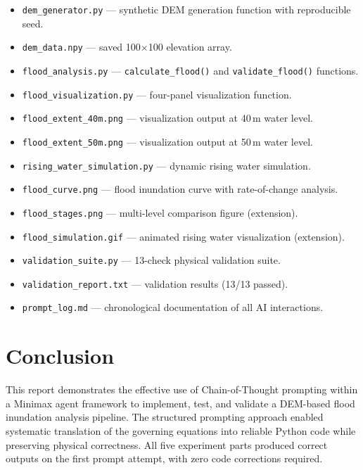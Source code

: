 \documentclass[12pt, a4paper]{article}
\begin{document}
\begin{itemize}[leftmargin=1.8em]
  \item \texttt{dem\_generator.py} --- synthetic DEM generation function with reproducible seed.
  \item \texttt{dem\_data.npy} --- saved 100$\times$100 elevation array.
  \item \texttt{flood\_analysis.py} --- \texttt{calculate\_flood()} and \texttt{validate\_flood()} functions.
  \item \texttt{flood\_visualization.py} --- four-panel visualization function.
  \item \texttt{flood\_extent\_40m.png} --- visualization output at 40\,m water level.
  \item \texttt{flood\_extent\_50m.png} --- visualization output at 50\,m water level.
  \item \texttt{rising\_water\_simulation.py} --- dynamic rising water simulation.
  \item \texttt{flood\_curve.png} --- flood inundation curve with rate-of-change analysis.
  \item \texttt{flood\_stages.png} --- multi-level comparison figure (extension).
  \item \texttt{flood\_simulation.gif} --- animated rising water visualization (extension).
  \item \texttt{validation\_suite.py} --- 13-check physical validation suite.
  \item \texttt{validation\_report.txt} --- validation results (13/13 passed).
  \item \texttt{prompt\_log.md} --- chronological documentation of all AI interactions.
\end{itemize}

\section{Conclusion}

This report demonstrates the effective use of Chain-of-Thought prompting within a Minimax agent framework to implement, test, and validate a DEM-based flood inundation analysis pipeline. The structured prompting approach enabled systematic translation of the governing equations into reliable Python code while preserving physical correctness. All five experiment parts produced correct outputs on the first prompt attempt, with zero code corrections required.
\end{document}
